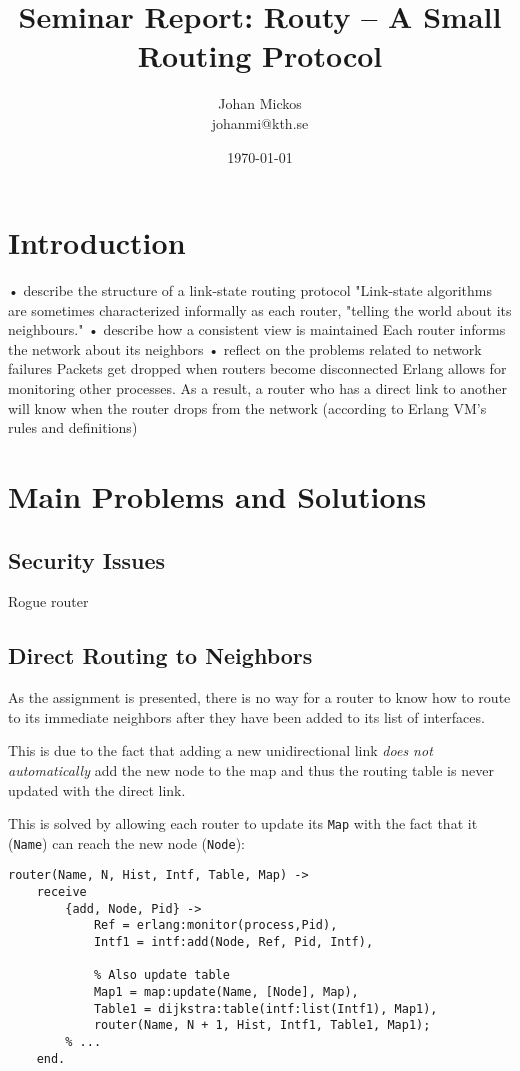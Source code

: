 \documentclass[a4paper, 11pt]{article}
\title{Seminar Report: Routy -- A Small Routing Protocol}
\author{Johan Mickos \\ johanmi@kth.se}
\date{\today{}}
\begin{document}
\maketitle
\newpage

\section{Introduction}

• describe the structure of a link-state routing protocol
    "Link-state algorithms are sometimes characterized informally as each router, "telling the world about its neighbours."
• describe how a consistent view is maintained
    Each router informs the network about its neighbors
• reflect on the problems related to network failures
    Packets get dropped when routers become disconnected
    Erlang allows for monitoring other processes. As a result, a router who has a direct link to another will know when the router drops from the network (according to Erlang VM's rules and definitions)

\section{Main Problems and Solutions}
\subsection{Security Issues}
Rogue router
\subsection{Direct Routing to Neighbors}
As the assignment is presented, there is no way for a router to know how to route to its immediate neighbors after they have been added to its list of interfaces.

This is due to the fact that adding a new unidirectional link \textit{does not automatically} add the new node to the map and thus the routing table is never updated with the direct link.

This is solved by allowing each router to update its \texttt{Map} with the fact that it (\texttt{Name}) can reach the new node (\texttt{Node}):
\begin{verbatim}
router(Name, N, Hist, Intf, Table, Map) ->
    receive
        {add, Node, Pid} ->
            Ref = erlang:monitor(process,Pid),
            Intf1 = intf:add(Node, Ref, Pid, Intf),

            % Also update table
            Map1 = map:update(Name, [Node], Map),
            Table1 = dijkstra:table(intf:list(Intf1), Map1),
            router(Name, N + 1, Hist, Intf1, Table1, Map1);
        % ...
    end.
\end{verbatim}
\end{document}
